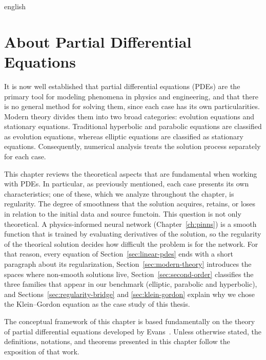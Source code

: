\documentclass[0000.tex]{subfiles}
\begin{document}

\begin{hyphenrules}{english}

\chapter{About Partial Differential Equations}\label{ch:pdes}

It is now well established that partial differential equations (PDEs) are the primary tool for
modeling phenomena in physics and engineering, and that there is no general method for solving them,
since each case has its own particularities. Modern theory divides them into two broad categories:
evolution equations and stationary equations. Traditional hyperbolic and parabolic equations are
classified as evolution equations, whereas elliptic equations are classified as stationary equations.
Consequently, numerical analysis treats the solution process separately for each case.

This chapter reviews the theoretical aspects that are fundamental when working with PDEs. 
In particular, as previously mentioned, each case presents its own characteristics; one of these, 
which we analyze throughout the chapter, is regularity. The degree of smoothness that the solution acquires, 
retains, or loses in relation to the initial data and source functoin. This question is not only theoretical. 
A physics-informed neural network (Chapter~\ref{ch:pinns}) is a smooth function that is trained by evaluating derivatives of the
solution, so the regularity of the theorical solution decides how difficult the problem
is for the network. For that reason, every equation of Section~\ref{sec:linear-pdes} ends with a short
paragraph about its regularization, Section~\ref{sec:modern-theory} introduces the spaces where non-smooth
solutions live, Section~\ref{sec:second-order} classifies the three families that appear in our benchmark
(elliptic, parabolic and hyperbolic), and Sections~\ref{sec:regularity-bridge} and \ref{sec:klein-gordon} explain why we
chose the Klein--Gordon equation as the case study of this thesis.

The conceptual framework of this chapter is based fundamentally on the theory of partial differential
equations developed by Evans~\cite{evans2010}. Unless otherwise stated, the definitions, notations, and
theorems presented in this chapter follow the exposition of that work.


\end{hyphenrules}
\end{document}
